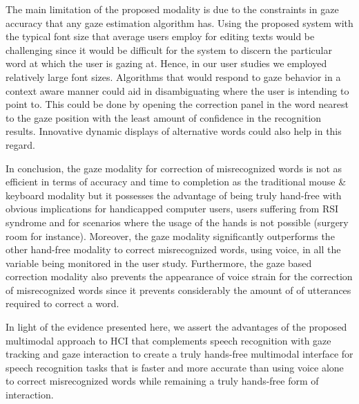 \documentclass[]{article}
\begin{document}
The main limitation of the proposed modality is due to the constraints in gaze accuracy that any gaze estimation
algorithm  has. Using the proposed system with the typical font size that average users employ for editing texts would
be challenging since it would be difficult for the system to discern the particular word at which the user is gazing
at. Hence, in our user studies we employed relatively large font sizes. Algorithms that would respond to gaze behavior
in a context aware manner could aid in disambiguating where the user is intending to point to. This could be done by
opening the correction panel in the word nearest to the gaze position with the least amount of confidence in the
recognition results. Innovative dynamic displays of alternative words could also help in this regard.


In conclusion, the gaze modality for correction of misrecognized words is not as efficient in terms of accuracy and time
to completion as the traditional mouse \& keyboard modality but it possesses the advantage of being truly hand-free with
obvious  implications for handicapped computer users, users suffering from RSI syndrome and for scenarios where the
usage of the hands is not possible (surgery room for instance). Moreover, the gaze modality significantly outperforms
the other hand-free modality to correct misrecognized words, using voice, in all the variable being monitored in the
user study. Furthermore, the gaze based correction modality also prevents the appearance of voice strain for the
correction of misrecognized words since it prevents considerably the amount of of utterances required to correct a word.


In light of the evidence presented here, we assert the advantages of the proposed multimodal approach to HCI that
complements speech recognition with gaze tracking and gaze interaction to create a truly hands-free multimodal interface
for speech recognition tasks that is faster and more accurate than using voice alone to correct misrecognized words
while remaining a truly hands-free form of interaction.




\end{document}
